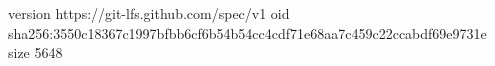 version https://git-lfs.github.com/spec/v1
oid sha256:3550c18367c1997bfbb6cf6b54b54cc4cdf71e68aa7c459c22ccabdf69e9731e
size 5648
